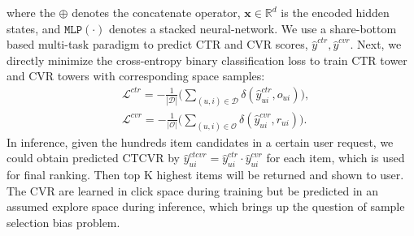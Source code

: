 where the $\oplus$ denotes the concatenate operator, $\mathbf{x}\in\mathbb{R}^d$ is the encoded hidden states, and $\texttt{MLP}(\cdot)$ denotes a stacked neural-network. We use a share-bottom based multi-task paradigm to predict CTR and CVR scores, $\hat{y}^{ctr},\hat{y}^{cvr}$.
%
Next, we directly minimize the cross-entropy binary classification loss to train CTR tower and CVR towers with corresponding space samples:
%
%
%
\begin{equation}
\begin{split}
&\mathcal{L}^{ctr} = - \frac{1}{|\mathcal{D}|}\big(\sum_{(u,i)\in\mathcal{D}}\delta(\hat{y}^{ctr}_{ui}, o_{ui})\big),\\
&\mathcal{L}^{cvr} = - \frac{1}{|\mathcal{O}|}\big(\sum_{(u,i)\in\mathcal{O}}\delta(\hat{y}^{cvr}_{ui}, r_{ui})\big).
\end{split}
\label{crossentropy}
\end{equation}
%
% 
%
In inference, given the hundreds item candidates in a certain user request, we could obtain predicted CTCVR by  $\hat{y}^{ctcvr}_{ui} =\hat{y}^{ctr}_{ui} \cdot \hat{y}^{cvr}_{ui}$ for each item, which is used for final ranking. Then top K highest items will be returned and shown to user. The CVR are learned in click space during training but be predicted in an assumed explore space during inference, which brings up the question of sample selection bias problem.
% 






